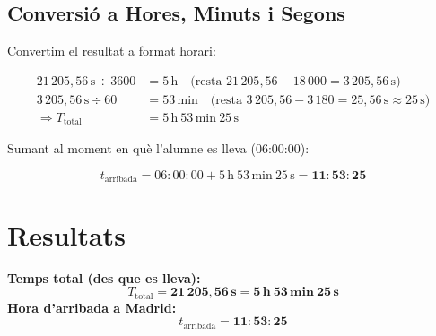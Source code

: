 \documentclass[12pt,a4paper]{article}
\begin{document}
\subsection{Conversió a Hores, Minuts i Segons}

Convertim el resultat a format horari:

\begin{align*}
21\,205{,}56\,\text{s} \div 3600 &= 5\,\text{h} \quad \text{(resta } 21\,205{,}56 - 18\,000 = 3\,205{,}56\,\text{s)} \\
3\,205{,}56\,\text{s} \div 60    &= 53\,\text{min} \quad \text{(resta } 3\,205{,}56 - 3\,180 = 25{,}56\,\text{s} \approx 25\,\text{s)} \\
\Rightarrow T_{\text{total}}     &= 5\,\text{h}\ 53\,\text{min}\ 25\,\text{s}
\end{align*}

Sumant al moment en què l'alumne es lleva (06:00:00):

\begin{equation}
t_{\text{arribada}} = 06{:}00{:}00 + 5\,\text{h}\ 53\,\text{min}\ 25\,\text{s} = \mathbf{11{:}53{:}25}
\label{eq:arriba}
\end{equation}

\section{Resultats}

\begin{tcolorbox}[title=Resultats Finals,colframe=green!50!black,colback=green!8,sharp corners=south]
\textbf{Temps total (des que es lleva):}
\[
T_{\text{total}} = \mathbf{21\,205{,}56\,\text{s}} = \mathbf{5\,\text{h}\ 53\,\text{min}\ 25\,\text{s}}
\]
\textbf{Hora d'arribada a Madrid:}
\[
t_{\text{arribada}} = \mathbf{11{:}53{:}25}
\]
\end{tcolorbox}
\end{document}
